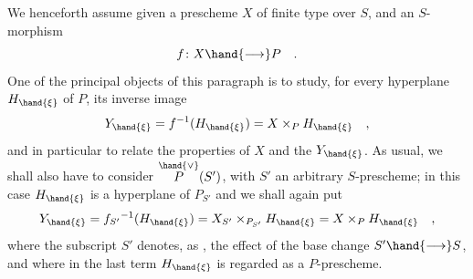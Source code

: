 We henceforth assume given a prescheme $X$ of finite type over $S$,
and an $S$-morphism
\[ f\colon X\hand{\longrightarrow} P \quad . \]
One of the principal objects of this paragraph is to study, for every
hyperplane $H_{\hand{\xi}}$ of $P$,  its inverse image
\[ Y_{\hand{\xi}} = f^{-1}(H_{\hand{\xi}}) = X\times_P H_{\hand{\xi}} \quad , \]
and in particular to relate the properties of $X$ and the $Y_{\hand{\xi}}$. As
usual, we shall also have to consider $\overset{\hand{\vee}}{P}(S')$, with $S'$ 
an arbitrary $S$-prescheme; in this case $H_{\hand{\xi}}$ is a hyperplane of $P_{S'}$ \hand{,}
and we shall again put
\[ Y_{\hand{\xi}} = f_{S'}{}^{-1}(H_{\hand{\xi}}) = X_{S'}\times_{P_{S'}}H_{\hand{\xi}} = X\times_P H_{\hand{\xi}} \quad , \]
where the subscript $S'$ denotes, as ,  the effect of the base change
$S'\hand{\longrightarrow} S$, and where in the last term $H_{\hand{\xi}}$ is regarded as a $P$-prescheme.

